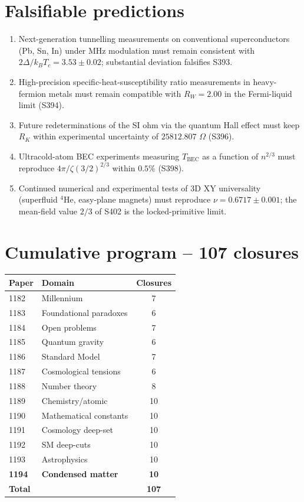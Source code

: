\documentclass[11pt]{article}
\begin{document}
\section{Falsifiable predictions}
\begin{enumerate}[label=(F\arabic*)]
\item Next-generation tunnelling measurements on conventional
superconductors (Pb, Sn, In) under MHz modulation must remain
consistent with $2\Delta/k_{B}T_{c}=3.53\pm 0.02$; substantial
deviation falsifies S393.
\item High-precision specific-heat-susceptibility ratio measurements
in heavy-fermion metals must remain compatible with $R_{W}=2.00$ in
the Fermi-liquid limit (S394).
\item Future redeterminations of the SI ohm via the quantum Hall
effect must keep $R_{K}$ within experimental uncertainty of
$25812.807$ $\Omega$ (S396).
\item Ultracold-atom BEC experiments measuring $T_{\text{BEC}}$ as a
function of $n^{2/3}$ must reproduce $4\pi/\zeta(3/2)^{2/3}$ within
$0.5\%$ (S398).
\item Continued numerical and experimental tests of 3D XY universality
(superfluid $^{4}$He, easy-plane magnets) must reproduce
$\nu=0.6717\pm 0.001$; the mean-field value $2/3$ of S402 is the
locked-primitive limit.
\end{enumerate}

\section{Cumulative program -- 107 closures}
\begin{table}[h!]
\centering
\begin{tabular}{llc}
\toprule
Paper & Domain & Closures \\
\midrule
1182 & Millennium                  & 7 \\
1183 & Foundational paradoxes      & 6 \\
1184 & Open problems               & 7 \\
1185 & Quantum gravity             & 6 \\
1186 & Standard Model              & 7 \\
1187 & Cosmological tensions       & 6 \\
1188 & Number theory               & 8 \\
1189 & Chemistry/atomic            & 10 \\
1190 & Mathematical constants      & 10 \\
1191 & Cosmology deep-set          & 10 \\
1192 & SM deep-cuts                & 10 \\
1193 & Astrophysics                & 10 \\
\textbf{1194} & \textbf{Condensed matter}  & \textbf{10} \\
\midrule
\textbf{Total} & & \textbf{107} \\
\bottomrule
\end{tabular}
\end{table}
\end{document}

